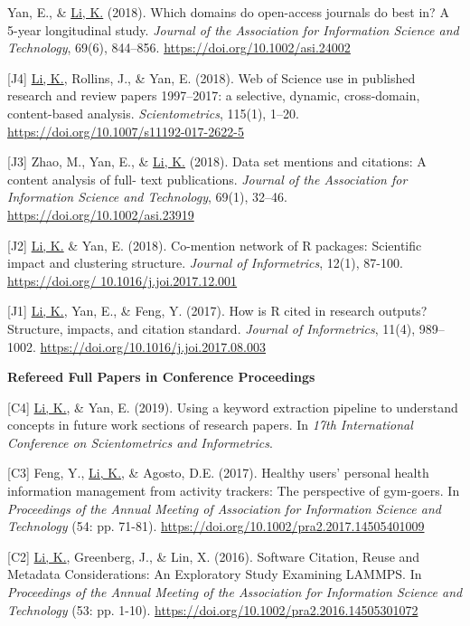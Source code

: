 \documentclass[margin, 10pt]{res} %
\begin{document}
\begin{resume}
[J5] Yan, E., \& \underline{Li, K.} (2018). Which domains do open-access journals do best in? A 5-year longitudinal study. \textit{Journal of the Association for Information Science and Technology}, 69(6), 844–856. \href{https://doi.org/10.1002/asi.24002}{https://doi.org/10.1002/asi.24002}

[J4] \underline{Li, K.}, Rollins, J., \& Yan, E. (2018). Web of Science use in published research and review papers 1997–2017: a selective, dynamic, cross-domain, content-based analysis. \textit{Scientometrics}, 115(1), 1–20. \href{https://doi.org/10.1007/s11192-017-2622-5}{https://doi.org/10.1007/s11192-017-2622-5}

[J3] Zhao, M., Yan, E., \& \underline{Li, K.} (2018). Data set mentions and citations: A content analysis of full- text publications. \textit{Journal of the Association for Information Science and Technology}, 69(1), 32–46. \href{https://doi.org/10.1002/asi.23919}{https://doi.org/10.1002/asi.23919}

[J2] \underline{Li, K.} \& Yan, E. (2018). Co-mention network of R packages: Scientific impact and clustering structure. \textit{Journal of Informetrics}, 12(1), 87-100. \href{https://doi.org/10.1016/j.joi.2017.12.001}{https://doi.org/ 10.1016/j.joi.2017.12.001}

[J1] \underline{Li, K.}, Yan, E., \& Feng, Y. (2017). How is R cited in research outputs? Structure, impacts, and citation standard. \textit{Journal of Informetrics}, 11(4), 989–1002. \href{https://doi.org/10.1016/j.joi.2017.08.003}{https://doi.org/10.1016/j.joi.2017.08.003}

\textbf{Refereed Full Papers in Conference Proceedings}

[C4] \underline{Li, K.}, \& Yan, E. (2019). Using a keyword extraction pipeline to understand concepts in future work sections of research papers. In \textit{17th International Conference on Scientometrics and Informetrics}.

[C3] Feng, Y., \underline{Li, K.}, \& Agosto, D.E. (2017). Healthy users’ personal health information management from activity trackers: The perspective of gym-goers. In \textit{Proceedings of the Annual Meeting of Association for Information Science and Technology} (54: pp. 71-81). \href{https://doi.org/10.1002/pra2.2017.14505401009}{https://doi.org/10.1002/pra2.2017.14505401009}

[C2] \underline{Li, K.}, Greenberg, J., \& Lin, X. (2016). Software Citation, Reuse and Metadata Considerations: An Exploratory Study Examining LAMMPS. In \textit{Proceedings of the Annual Meeting of the Association for Information Science and Technology} (53: pp. 1-10). \href{https://doi.org/10.1002/pra2.2016.14505301072}{https://doi.org/10.1002/pra2.2016.14505301072}


\end{resume}
\end{document}
